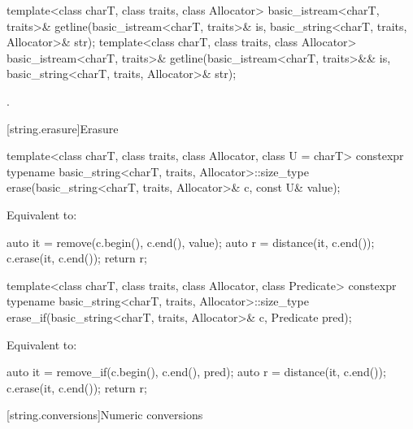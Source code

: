 %
\begin{itemdecl}
template<class charT, class traits, class Allocator>
  basic_istream<charT, traits>&
    getline(basic_istream<charT, traits>& is,
            basic_string<charT, traits, Allocator>& str);
template<class charT, class traits, class Allocator>
  basic_istream<charT, traits>&
    getline(basic_istream<charT, traits>&& is,
            basic_string<charT, traits, Allocator>& str);
\end{itemdecl}

\begin{itemdescr}
\pnum
\returns
{}.
\end{itemdescr}

[string.erasure]{Erasure}

%
\begin{itemdecl}
template<class charT, class traits, class Allocator, class U = charT>
  constexpr typename basic_string<charT, traits, Allocator>::size_type
    erase(basic_string<charT, traits, Allocator>& c, const U& value);
\end{itemdecl}

\begin{itemdescr}
\pnum
\effects
Equivalent to:
\begin{codeblock}
auto it = remove(c.begin(), c.end(), value);
auto r = distance(it, c.end());
c.erase(it, c.end());
return r;
\end{codeblock}
\end{itemdescr}

%
\begin{itemdecl}
template<class charT, class traits, class Allocator, class Predicate>
  constexpr typename basic_string<charT, traits, Allocator>::size_type
    erase_if(basic_string<charT, traits, Allocator>& c, Predicate pred);
\end{itemdecl}

\begin{itemdescr}
\pnum
\effects
Equivalent to:
\begin{codeblock}
auto it = remove_if(c.begin(), c.end(), pred);
auto r = distance(it, c.end());
c.erase(it, c.end());
return r;
\end{codeblock}
\end{itemdescr}

[string.conversions]{Numeric conversions}

